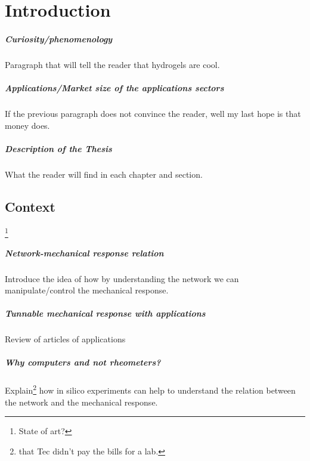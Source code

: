 \chapter{Introduction}\label{ch1:Intro}


\paragraph{Curiosity/phenomenology} Paragraph that will tell the reader that hydrogels are cool.

\paragraph{Applications/Market size of the applications sectors} If the previous paragraph does not convince the reader, well my last hope is that money does.

\paragraph{Description of the Thesis} What the reader will find in each chapter and section.

\section{Context}\footnote{State of art?}\label{ch1:Context}

\paragraph{Network-mechanical response relation} Introduce the idea of how by understanding the network we can manipulate/control the mechanical response.

\paragraph{Tunnable mechanical response with applications} Review of articles of applications 

\paragraph{Why computers and not rheometers?} Explain\footnote{that Tec didn't pay the bills for a lab.} how in silico experiments can help to understand the relation between the network and the mechanical response.



 
\newpage
